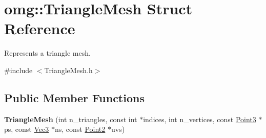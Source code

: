 \hypertarget{structomg_1_1_triangle_mesh}{}\section{omg\+::Triangle\+Mesh Struct Reference}
\label{structomg_1_1_triangle_mesh}


Represents a triangle mesh.  




{\ttfamily \#include $<$Triangle\+Mesh.\+h$>$}

\subsection*{Public Member Functions}
\begin{DoxyCompactItemize}
\item 
\mbox{\label{structomg_1_1_triangle_mesh_ae4774a77ea648104e2bc74333941db07}} 
{\bfseries Triangle\+Mesh} (int n\+\_\+triangles, const int $\ast$indices, int n\+\_\+vertices, const \mbox{\hyperlink{namespaceomg_af85242d35fdacf829d32a6f9b95f3e35}{Point3}} $\ast$ps, const \mbox{\hyperlink{namespaceomg_a45a9482677fee9933ff369b49894e316}{Vec3}} $\ast$ns, const \mbox{\hyperlink{namespaceomg_a18e42fb7bbc4159e9137145b866ec578}{Point2}} $\ast$uvs)
\end{DoxyCompactItemize}
